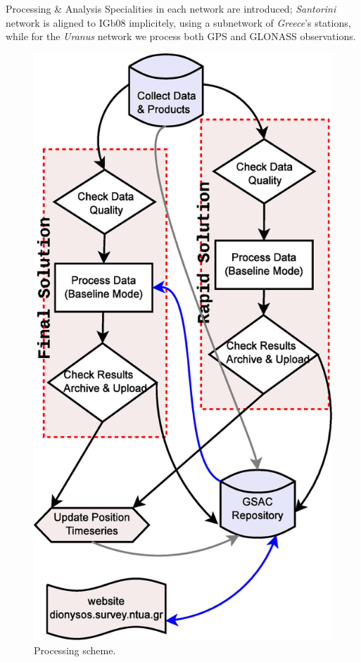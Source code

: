 \documentclass[final,a0,portrait]{beamer}
\newlength{\onecolwid}
\begin{document}
\begin{frame}[t]
\begin{columns}[t]
\begin{column}{\onecolwid}
\begin{block}{Processing \& Analysis}
{Specialities in each network are introduced; \emph{Santorini} network is aligned to IGb08 implicitely, using a subnetwork of 
\emph{Greece}'s stations, while for the \emph{Uranus} network we process both GPS and GLONASS observations.
}
\begin{figure}
\centering
\begin{minipage}{.45\textwidth}
    \centering
    \includegraphics[width=.55\linewidth]{Diagram1.eps}
    \caption{Processing scheme.} %
    \label{fig:process}
\end{minipage}%
\begin{minipage}{.45\textwidth}
    \centering

\end{minipage}
\end{figure}
\end{block}
\end{column}
\end{columns}
\end{frame}
\end{document}
